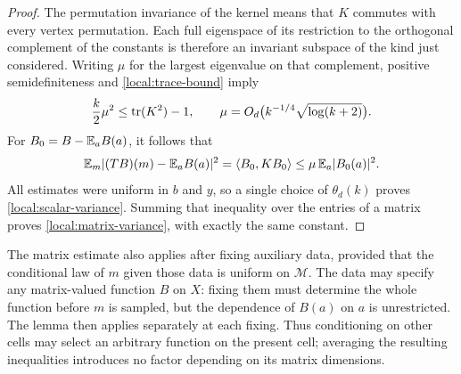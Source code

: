 \begin{proof}
The permutation invariance of the kernel means that $K$ commutes
with every vertex permutation.  Each full eigenspace of its
restriction to the orthogonal complement of the constants is
therefore an invariant subspace of the kind just considered.
Writing $\mu$ for the largest eigenvalue on that complement,
positive semidefiniteness and
\eqref{local:trace-bound} imply
\[
  \frac k2\mu^2\le\operatorname{tr}(K^2)-1,
  \qquad
  \mu=O_d\bigl(k^{-1/4}\sqrt{\log(k+2)}\bigr).
\]
For $B_0=B-\mathbb E_aB(a)$, it follows that
\[
  \mathbb E_m|(TB)(m)-\mathbb E_aB(a)|^2
   =\langle B_0,KB_0\rangle
   \le\mu\,\mathbb E_a|B_0(a)|^2.
\]
All estimates were uniform in $b$ and $y$, so a single choice of
$\theta_d(k)$ proves \eqref{local:scalar-variance}.  Summing that
inequality over the entries of a matrix proves
\eqref{local:matrix-variance}, with exactly the same constant.
\end{proof}

The matrix estimate also applies after fixing auxiliary data, provided
that the conditional law of $m$ given those data is uniform on
$\mathcal M$.  The data may specify any matrix-valued function $B$
on $X$: fixing them must determine the whole function before $m$ is
sampled, but the dependence of $B(a)$ on $a$ is unrestricted.
The lemma then applies separately at each fixing.  Thus conditioning
on other cells may select an arbitrary function on the present cell;
averaging the resulting inequalities introduces no factor depending
on its matrix dimensions.
